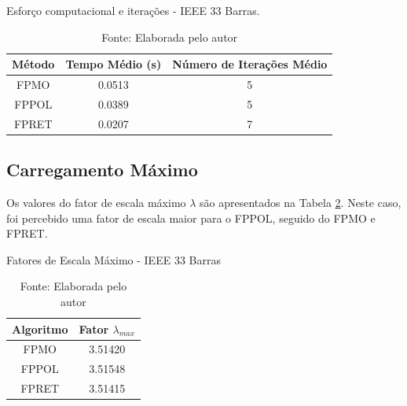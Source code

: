 \begin{table}[H]
    \centering
    \caption{Esforço computacional e iterações - IEEE 33 Barras.}
    \begin{tabular}{c c c }
        \toprule
        Método & Tempo Médio (s)& Número de Iterações Médio \\
        \midrule
        FPMO & 0.0513 & 5 \\
        FPPOL & 0.0389 & 5 \\
        FPRET & 0.0207 & 7 \\
        \bottomrule
    \end{tabular}
    \caption*{Fonte: Elaborada pelo autor}
    \label{tabela_tempo_33}
\end{table}

\subsection{Carregamento Máximo}
Os valores do fator de escala máximo $\lambda$ são apresentados na Tabela \ref{tabela_fatores_escala_33}. Neste caso, foi percebido uma fator de escala maior para o \acs{FPPOL}, seguido do \ac{FPMO} e \ac{FPRET}. 
\begin{table}[H]
\centering
\caption{Fatores de Escala Máximo - IEEE 33 Barras}
\begin{tabular}{c c}
\hline
\textbf{Algoritmo} & \textbf{Fator $\lambda_{max}$} \\
\hline
FPMO &  3.51420 \\
FPPOL & 3.51548 \\
FPRET & 3.51415\\
\hline
\end{tabular}
\label{tabela_fatores_escala_33}
\caption*{Fonte: Elaborada pelo autor}
\end{table}

































\clearpage
